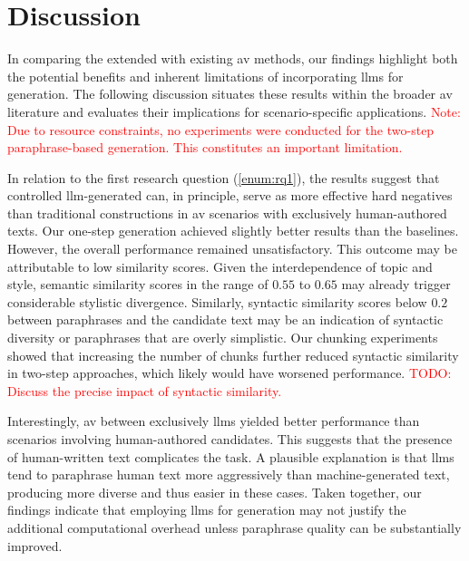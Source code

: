 \chapter{Discussion}
\label{chap:discussion}

In comparing the extended \impAppr{} with existing \ac{av} methods, our findings highlight both the potential benefits and inherent limitations of incorporating \acp{llm} for \imp{} generation. 
The following discussion situates these results within the broader \ac{av} literature and evaluates their implications for scenario-specific applications. 
\textcolor{red}{Note: Due to resource constraints, no experiments were conducted for the two-step paraphrase-based \imp{} generation. This constitutes an important limitation.}

In relation to the first research question (\autoref{enum:rq1}), the results suggest that controlled \ac{llm}-generated \imps{} can, in principle, serve as more effective hard negatives than traditional constructions in \ac{av} scenarios with exclusively human-authored texts. 
Our one-step \imp{} generation achieved slightly better results than the baselines. 
However, the overall performance remained unsatisfactory. 
This outcome may be attributable to low similarity scores. 
Given the interdependence of topic and style, semantic similarity scores in the range of $0.55$ to $0.65$ may already trigger considerable stylistic divergence. 
Similarly, syntactic similarity scores below $0.2$ between paraphrases and the candidate text may be an indication of syntactic diversity or paraphrases that are overly simplistic. 
Our chunking experiments showed that increasing the number of chunks further reduced syntactic similarity in two-step approaches, which likely would have worsened performance. 
\textcolor{red}{TODO: Discuss the precise impact of syntactic similarity.}

Interestingly, \ac{av} between exclusively \acp{llm} yielded better performance than scenarios involving human-authored candidates. 
This suggests that the presence of human-written text complicates the task. 
A plausible explanation is that \acp{llm} tend to paraphrase human text more aggressively than machine-generated text, producing more diverse and thus easier \imps{} in these cases. 
Taken together, our findings indicate that employing \acp{llm} for \imp{} generation may not justify the additional computational overhead unless paraphrase quality can be substantially improved.


